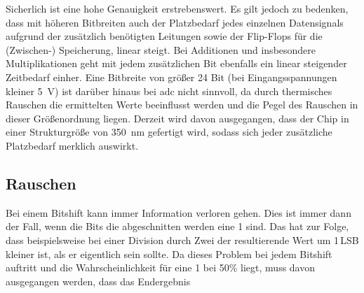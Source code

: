 Sicherlich ist eine hohe Genauigkeit erstrebenswert. Es gilt jedoch zu bedenken, dass mit höheren Bitbreiten auch der Platzbedarf jedes einzelnen Datensignals aufgrund der 
zusätzlich benötigten Leitungen sowie der Flip-Flops für die (Zwischen-) Speicherung, linear steigt. 
Bei Additionen und insbesondere Multiplikationen geht mit jedem zusätzlichen Bit ebenfalls ein linear steigender Zeitbedarf einher.
Eine Bitbreite von größer 24 Bit (bei Eingangsspannungen kleiner \SI{5}{V}) ist darüber hinaus bei \gls{adc} nicht sinnvoll, da durch thermisches Rauschen die ermittelten 
Werte beeinflusst werden und die Pegel des Rauschen in dieser Größenordnung liegen.
Derzeit wird davon ausgegangen, dass der Chip in einer Strukturgröße von \SI{350}{nm} gefertigt wird, sodass sich jeder zusätzliche Platzbedarf merklich auswirkt.


 
\subsection{Rauschen}
Bei einem Bitshift kann immer Information verloren gehen. Dies ist immer dann der Fall, wenn die Bits die abgeschnitten werden eine 1 sind. Das hat zur Folge, dass beispielsweise
bei einer Division durch Zwei der resultierende Wert um 1\,LSB kleiner ist, als er eigentlich sein sollte. 
Da dieses Problem bei jedem Bitshift auftritt und die Wahrscheinlichkeit für eine 1 bei 50$\%$ liegt, muss davon ausgegangen werden, dass das Endergebnis 

